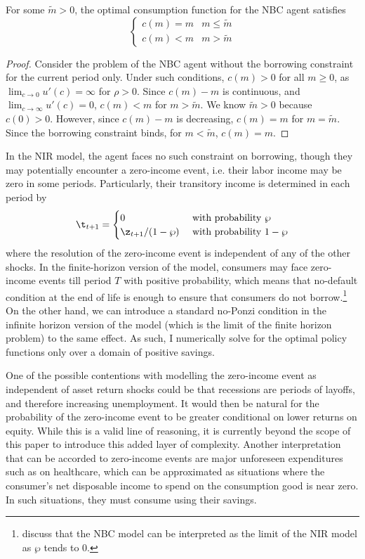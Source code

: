 \begin{lemma}\label{lm:nbc_kink}
    For some $\tilde{m} > 0$, the optimal consumption function for the NBC agent satisfies
    \[
    \begin{cases}
        c(m) = m & m \leq \tilde{m}\\
        c(m) < m & m > \tilde{m}
    \end{cases}
    \]
\end{lemma}

\begin{proof}
    Consider the problem of the NBC agent without the borrowing constraint for the current period only. Under such conditions, $c(m) > 0$ for all $m \geq 0$, as $\lim_{c \to 0}u'(c) = \infty$ for $\rho > 0$. Since $c(m) - m$ is continuous, and $\lim_{c \to \infty}u'(c) = 0$, $c(m) < m$ for $m > \tilde{m}$. We know $\tilde{m} > 0$ because $c(0) > 0$. However, since $c(m) - m$ is decreasing, $c(m) = m$ for $m = \tilde{m}$. Since the borrowing constraint binds, for $m < \tilde{m}$, $c(m) = m$.
\end{proof}

In the NIR model, the agent faces no such constraint on borrowing, though they may potentially encounter a zero-income event, i.e. their labor income may be zero in some periods. Particularly, their transitory income is determined in each period by
\[
\t_{t+1} = \begin{cases}
    0 & \text{ with probability } \wp\\
    \z_{t+1} / (1 - \wp) & \text{ with probability } 1 - \wp
\end{cases}
\]
where the resolution of the zero-income event is independent of any of the other shocks. In the finite-horizon version of the model, consumers may face zero-income events till period $T$ with positive probability, which means that no-default condition at the end of life is enough to ensure that consumers do not borrow.\footnote{\citet{Carroll2024b} discuss that the NBC model can be interpreted as the limit of the NIR model as $\wp$ tends to 0.} On the other hand, we can introduce a standard no-Ponzi condition in the infinite horizon version of the model (which is the limit of the finite horizon problem) to the same effect. As such, I numerically solve for the optimal policy functions only over a domain of positive savings.

One of the possible contentions with modelling the zero-income event as independent of asset return shocks could be that recessions are periods of layoffs, and therefore increasing unemployment. It would then be natural for the probability of the zero-income event to be greater conditional on lower returns on equity. While this is a valid line of reasoning, it is currently beyond the scope of this paper to introduce this added layer of complexity. Another interpretation that can be accorded to zero-income events are major unforeseen expenditures such as on healthcare, which can be approximated as situations where the consumer's net disposable income to spend on the consumption good is near zero. In such situations, they must consume using their savings.

